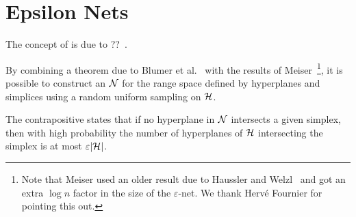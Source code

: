 \section{Epsilon Nets}%
\label{sec:divide-and-conquer:epsilon-nets}

The concept of \enets{} is due to ??~\cite{???}.
%


By combining a theorem due to Blumer et
al.~\cite{BEHW89} with the results of Meiser~\cite{M93}\footnote{Note that
Meiser used an older result due to Haussler and Welzl~\cite{H87} and got an
extra $\log n$ factor in the size of the $\varepsilon$-net. We thank Hervé
Fournier for pointing this out.}, it is possible to
construct an \enet{} \(\mathcal{N}\) for the range space
defined by hyperplanes and simplices using a random uniform sampling on \(\mathcal{H}\).
%

%
The contrapositive states that if no hyperplane in \(\mathcal{N}\) intersects
a given simplex, then with high probability the number of hyperplanes of
\(\mathcal{H}\) intersecting the simplex is at most \(\varepsilon |{\mathcal{H}}|\).
